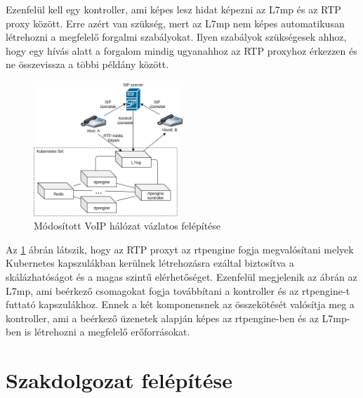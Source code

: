 Ezenfelül kell egy kontroller, ami képes lesz hidat képezni az L7mp és az RTP proxy 
között. Erre azért van szükség, mert az L7mp nem képes automatikusan létrehozni a 
megfelelő forgalmi szabályokat. Ilyen szabályok szükségesek ahhoz, hogy egy hívás alatt a 
forgalom mindig ugyanahhoz az RTP proxyhoz érkezzen és ne összevissza a többi példány 
között.  

\begin{figure}[H]
	\centering
	\includegraphics[width=0.5\textwidth, keepaspectratio]{figures/extended_traditional_voip.png}
	\caption{Módosított VoIP hálózat vázlatos felépítése}
	\label{fig:extVoIP}
\end{figure}

Az \ref{fig:extVoIP} ábrán látszik, hogy az RTP proxyt az rtpengine fogja megvalósítani
melyek Kubernetes kapszulákban kerülnek létrehozásra ezáltal biztosítva a skálázhatóságot
és a magas szintű elérhetőséget. Ezenfelül megjelenik az ábrán az L7mp, ami beérkező 
csomagokat fogja továbbítani a kontroller és az rtpengine-t futtató kapszulákhoz. Ennek
a két komponensnek az összekötését valósítja meg a kontroller, ami a beérkező üzenetek 
alapján képes az rtpengine-ben és az L7mp-ben is létrehozni a megfelelő erőforrásokat.  

\section{Szakdolgozat felépítése}


